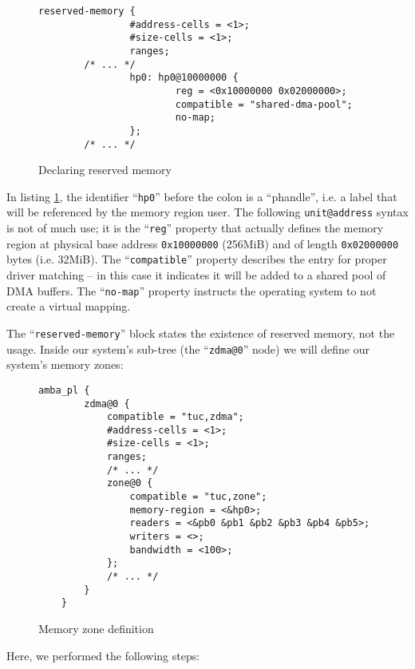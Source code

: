 \begin{figure}[ht!]
\centering
\begin{lstlisting}[style=basic]
        reserved-memory {
                #address-cells = <1>;
                #size-cells = <1>;
                ranges;
		/* ... */
                hp0: hp0@10000000 {
                        reg = <0x10000000 0x02000000>;
                        compatible = "shared-dma-pool";
                        no-map;
                };
		/* ... */
\end{lstlisting}
\caption{Declaring reserved memory}
\label{lst:resmem}
\end{figure}

In listing \ref{lst:resmem}, the identifier ``\texttt{hp0}'' before the colon is a ``phandle'',
i.e. a label that will be referenced by
the memory region user. The following \texttt{unit@address} syntax is not of much use;
it is the ``\texttt{reg}'' property that actually defines the memory region
at physical base address \texttt{0x10000000} (256MiB) and of length \texttt{0x02000000} bytes (i.e. 32MiB).
The ``\texttt{compatible}'' property describes the entry for proper driver matching --
in this case it indicates it will be added to a shared pool of DMA buffers.
The ``\texttt{no-map}'' property instructs the operating system to not create a virtual mapping.

The ``\texttt{reserved-memory}'' block states the existence of reserved memory, not the usage.
Inside our system's sub-tree (the ``\texttt{zdma@0}'' node) we will define our system's memory zones:

\begin{figure}[ht!]
\centering
\begin{lstlisting}[style=basic]
	amba_pl {
		zdma@0 {
			compatible = "tuc,zdma";
			#address-cells = <1>;
			#size-cells = <1>;
			ranges;
			/* ... */
			zone@0 {
				compatible = "tuc,zone";
				memory-region = <&hp0>;
				readers = <&pb0 &pb1 &pb2 &pb3 &pb4 &pb5>;
				writers = <>;
				bandwidth = <100>;
			};
			/* ... */
		}
	}
\end{lstlisting}
\caption{Memory zone definition}
\label{lst:memzone}
\end{figure}

Here, we performed the following steps:

